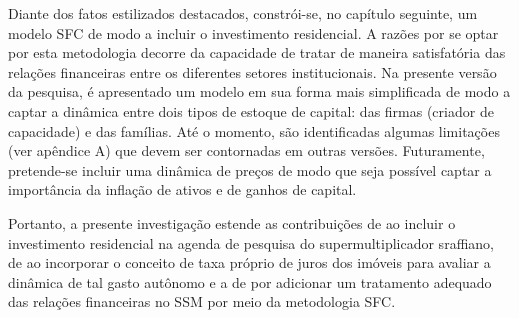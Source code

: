 
Diante dos fatos estilizados destacados, constrói-se, no capítulo seguinte, um modelo SFC de modo a incluir o investimento residencial. A razões por se optar por esta metodologia decorre da capacidade de tratar de maneira satisfatória das relações financeiras entre os diferentes setores institucionais. Na presente versão da pesquisa, é apresentado um modelo em sua forma mais simplificada de modo a captar a dinâmica entre dois tipos de estoque de capital: das firmas (criador de capacidade) e das famílias. Até o momento, são identificadas algumas limitações (ver apêndice A) que devem ser contornadas em outras versões. Futuramente, pretende-se incluir uma dinâmica de preços de modo que seja possível captar a importância da inflação de ativos e de ganhos de capital. 


Portanto, a presente investigação estende as contribuições de \textcite{serrano_sraffian_1995} ao incluir o investimento residencial na agenda de pesquisa do supermultiplicador sraffiano, de \textcite{teixeira_crescimento_2015} ao incorporar o conceito de taxa próprio de juros dos imóveis para avaliar a dinâmica de tal gasto autônomo e a de \textcite{brochier_supermultiplier_2018} por adicionar um tratamento adequado das relações financeiras no SSM por meio da metodologia SFC.

